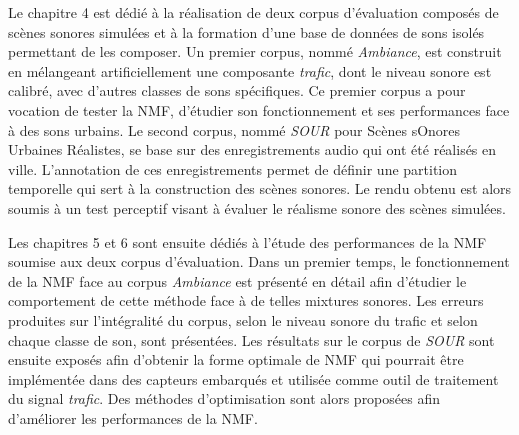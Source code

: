 Le chapitre 4 est dédié à la réalisation de deux corpus d'évaluation composés de scènes sonores simulées et à la formation d'une base de données de sons isolés permettant de les composer.
Un premier corpus, nommé \textit{Ambiance}, est construit en mélangeant artificiellement une composante \textit{trafic}, dont le niveau sonore est calibré, avec d'autres classes de sons spécifiques. Ce premier corpus a pour vocation de tester la NMF, d'étudier son fonctionnement et ses performances face à des sons urbains.
Le second corpus, nommé \textit{SOUR} pour Scènes sOnores Urbaines Réalistes, se base sur des enregistrements audio qui ont été réalisés en ville.
L'annotation de ces enregistrements permet de définir une partition temporelle qui sert à la construction des scènes sonores. Le rendu obtenu est alors soumis à un test perceptif visant à évaluer le réalisme sonore des scènes simulées.

Les chapitres 5 et 6 sont ensuite dédiés à l'étude des performances de la NMF soumise aux deux corpus d'évaluation. Dans un premier temps, le fonctionnement de la NMF face au corpus \textit{Ambiance} est présenté en détail afin d'étudier le comportement de cette méthode face à de telles mixtures sonores. Les erreurs produites sur l'intégralité du corpus, selon le niveau sonore du trafic et selon chaque classe de son, sont présentées.
Les résultats sur le corpus de \textit{SOUR} sont ensuite exposés afin d'obtenir la forme optimale de NMF qui pourrait être implémentée dans des capteurs embarqués et utilisée comme outil de traitement du signal \textit{trafic}. Des méthodes d'optimisation sont alors proposées afin d'améliorer les performances de la NMF.
